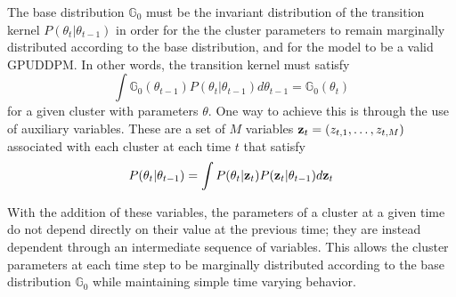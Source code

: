 \documentclass[twocolumn, final]{svjour3}
\begin{document}
The base distribution $\mathbb{G}_{0}$ must be the invariant distribution of the transition kernel $P(\theta_{t} | \theta_{t-1})$ in order for the the cluster parameters to remain marginally distributed according to the base distribution, and for the model to be a valid GPUDDPM. In other words, the transition kernel must satisfy
\begin{equation}
\int \mathbb{G}_{0}(\theta_{t-1})P(\theta_{t} | \theta_{t-1}) d\theta_{t-1} = \mathbb{G}_{0}(\theta_{t})
\end{equation}
for a given cluster with parameters $\theta$. One way to achieve this is through the use of auxiliary variables. These are a set of $M$ variables $\bold{z}_{t} = (z_{t,1}, \ldots, z_{t,M})$ associated with each cluster at each time $t$ that satisfy
\begin{eqnarray}
\label{auxiliaryvariablecriteria}
P(\theta_{t} | \theta_{t-1}) = \int P(\theta_{t} | \bold{z}_{t}) P(\bold{z}_{t} | \theta_{t-1}) d \bold{z}_{t}
\end{eqnarray}

With the addition of these variables, the parameters of a cluster at a given time do not depend directly on their value at the previous time; they are instead dependent through an intermediate sequence of variables. This allows the cluster parameters at each time step to be marginally distributed according to the base distribution $\mathbb{G}_{0}$ while maintaining simple time varying behavior.
\end{document}
